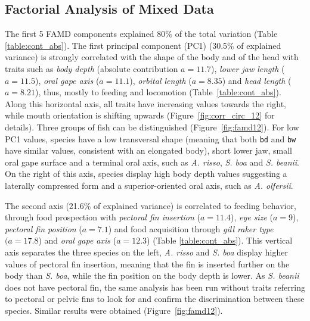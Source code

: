 
\subsection{Factorial Analysis of Mixed Data}

The first 5 FAMD components explained 80\% of the total variation (Table \ref{table:cont_abs}). The first principal component (PC1) (30.5\% of explained variance) is strongly correlated with the shape of the body and of the head with traits such as \emph{body depth} (absolute contribution $a = 11.7$), \emph{lower jaw length} ($a=11.5$), \emph{oral gape axis} ($a=11.1$), \emph{orbital length} ($a = 8.35$) and \emph{head length} ($a = 8.21$), thus, mostly to feeding and locomotion (Table~\ref{table:cont_abs}). Along this horizontal axis, all traits have increasing values towards the right, while mouth orientation is shifting upwards (Figure~\ref{fig:corr_circ_12} for details). Three groups of fish can be distinguished (Figure~\ref{fig:famd12}). For low PC1 values, species have a low transversal shape (meaning that both \texttt{bd} and \texttt{bw} have similar values, consistent with an elongated body), short lower jaw, small oral gape surface and a terminal oral axis, such as \textit{A. risso}, \textit{S. boa} and \textit{S. beanii}. On the right of this axis, species display high body depth values suggesting a laterally compressed form and a superior-oriented oral axis, such as \textit{A. olfersii}. 

The second axis (21.6\% of explained variance) is correlated to feeding behavior, through food prospection with \emph{pectoral fin insertion} ($a = 11.4$), \emph{eye size} ($a = 9$), \emph{pectoral fin position} ($a = 7.1$) and food acquisition through \emph{gill raker type} $(a = 17.8$) and \emph{oral gape axis} ($a = 12.3$) (Table \ref{table:cont_abs}). This vertical axis separates the three species on the left, \textit{A. risso} and \textit{S. boa} display higher values of pectoral fin insertion, meaning that the fin is inserted further on the body than \textit{S. boa}, while the fin position on the body depth is lower. As \textit{S. beanii} does not have pectoral fin, the same analysis has been run without traits referring to pectoral or pelvic fins to look for and confirm the discrimination between these species. Similar results were obtained (Figure~\ref{fig:famd12}).

